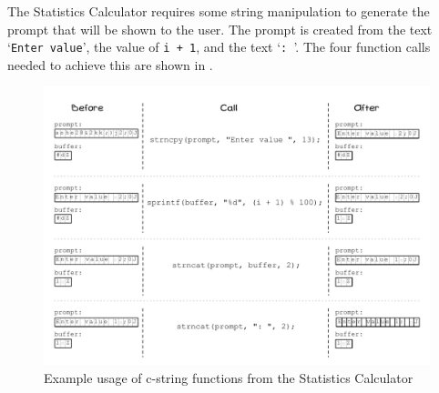 The Statistics Calculator requires some string manipulation to generate the prompt that will be shown to the user. The prompt is created from the text `\texttt{Enter value}', the value of \texttt{i + 1}, and the text `\texttt{: }'. The four function calls needed to achieve this are shown in .

\begin{figure}[htbp]
   \centering
   \includegraphics[width=\textwidth]{./topics/arrays/images/CStringOps} 
   \caption{Example usage of c-string functions from the Statistics Calculator}
   \label{fig:cstringops}
\end{figure}

